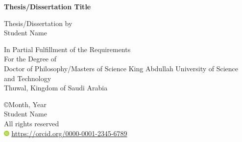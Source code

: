 \documentclass[onecolumn, 12 pt, doublespace, fullpage, a4paper]{report}
\newcommand{\orcid}{\includegraphics[width=8pt]{ORCID}} %
\begin{document}

\thispagestyle{empty}
\addvspace{5mm}  %


\begin{center}
\begin{doublespace}
{\textbf{{\large Thesis/Dissertation Title}}}%
\end{doublespace}

\vspace{10mm}
{Thesis/Dissertation by}\\
{Student Name} %

\vspace{30mm}

{ In Partial Fulfillment of the Requirements}\\[12pt]
{ For the Degree of}\\[12pt]
{Doctor of Philosophy/Masters of Science} \vfill
{King Abdullah University of Science and Technology }\\
{Thuwal, Kingdom of Saudi Arabia}
\vfill


\begin{onehalfspace}
{\copyright Month, Year}\\
Student Name\\               %
All rights reserved\\

\orcid{} \small \href{https://orcid.org/0000-0001-2345-6789}{https://orcid.org/0000-0001-2345-6789}\\
\end{onehalfspace}

\end{center}
\newpage


%
\chaptertitlefont{\fontsize{14}{15}\selectfont\centering}  

\end{document}
